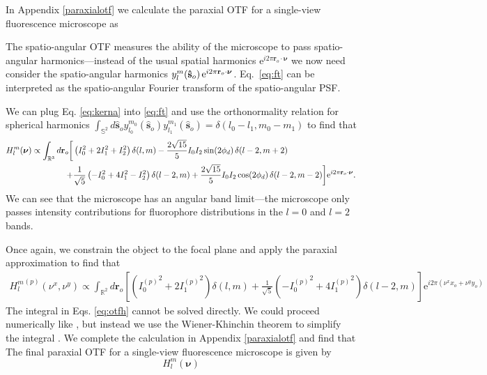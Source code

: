 \documentclass[11pt]{article}
\newcommand{\me}{\mathrm{e}}
\providecommand{\mb}[1]{\mathbf{#1}}
\providecommand{\ro}[1]{\mathbf{\mathbf{r}}_o}
\providecommand{\so}[1]{\mathbf{\hat{s}}_o}
\providecommand{\bs}[1]{\boldsymbol{#1}}
\begin{document}
In Appendix \ref{paraxialotf} we calculate the paraxial OTF for a single-view
fluorescence microscope as



The spatio-angular OTF measures the ability of the microscope to pass
spatio-angular harmonics---instead of the usual spatial harmonics
$\me^{i 2\pi \ro{}\cdot\bs{\nu}}$ we now need consider the spatio-angular
harmonics $y_l^m(\so{})\thinspace\me^{i 2\pi
  \ro{}\cdot\bs{\nu}}$. Eq.~\ref{eq:ft} can be interpreted as the
spatio-angular Fourier transform of the spatio-angular PSF.

We can plug Eq. \ref{eq:kerna} into \ref{eq:ft} and use the orthonormality
relation for spherical harmonics $\int_{\mathbb{S}^2}d\so{} y_{l_0}^{m_0}(\so{})y_{l_1}^{m_1}(\so{}) = \delta(l_0 - l_1, m_0 - m_1)$ to find that
\begin{equation}
  \begin{split}
  H_l^m(\bs{\nu}) \propto \int_{\mathbb{R}^3}d\ro{}  \bigg[&\left(I_0^2 + 2I_1^2 + I_2^2\right) \delta(l, m) - \frac{2\sqrt{15}}{5}I_0I_2\sin(2\phi_d)\thinspace \delta(l-2, m+2)\\ +& \frac{1}{\sqrt{5}}\left(-I_0^2 + 4I_1^2 - I_2^2\right) \delta(l-2, m) +\frac{2\sqrt{15}}{5}I_0I_2\cos(2\phi_d) \thinspace \delta(l-2, m-2)\bigg]\me^{i 2\pi \ro{}\cdot\bs{\nu}}.\label{eq:otf}
\end{split}
\end{equation}
We can see that the microscope has an angular band limit---the microscope only
passes intensity contributions for fluorophore distributions in the $l=0$ and
$l=2$ bands.

Once again, we constrain the object to the focal plane and apply the paraxial
approximation to find that
\begin{align}
  {H_l^m}^{(p)}(\nu^x, \nu^y) \propto \int_{\mathbb{R}^2}d\mb{r}_o\left[\left({I_0^{(p)}}^2 + 2{I_1^{(p)}}^2\right)\delta(l, m) + \frac{1}{\sqrt{5}}\left(-{I_0^{(p)}}^2 + 4{I_1^{(p)}}^2\right)\delta(l-2, m)\right]  \me^{i 2\pi(\nu^xx_o + \nu^yy_o)}\label{eq:otfh}
\end{align}
The integral in Eqs. \ref{eq:otfh} cannot be solved directly. We could proceed
numerically like \cite{backer2014}, but instead we use the Wiener-Khinchin
theorem to simplify the integral \cite{goodman1996, papoulis2002}. We complete
the calculation in Appendix \ref{paraxialotf} and find that
The final paraxial OTF for a single-view fluorescence microscope is
given by
\begin{equation}
  H_l^m(\bs{\nu})
\end{equation}
\end{document}
